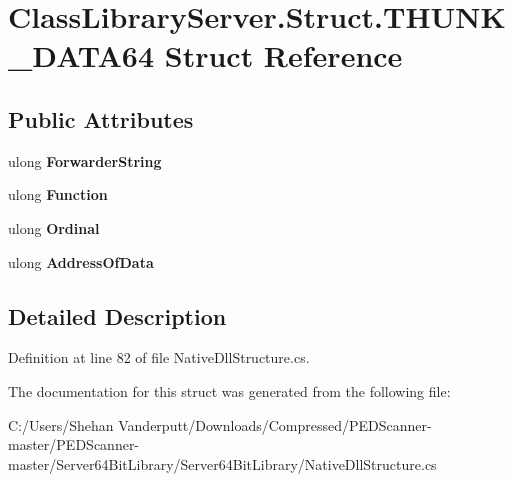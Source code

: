 \hypertarget{struct_class_library_server_1_1_struct_1_1_t_h_u_n_k___d_a_t_a64}{}\section{Class\+Library\+Server.\+Struct.\+T\+H\+U\+N\+K\+\_\+\+D\+A\+T\+A64 Struct Reference}
\label{struct_class_library_server_1_1_struct_1_1_t_h_u_n_k___d_a_t_a64}
\subsection*{Public Attributes}
\begin{DoxyCompactItemize}
\item 
\mbox{\label{struct_class_library_server_1_1_struct_1_1_t_h_u_n_k___d_a_t_a64_a3c1a35933a1fb6204aa82f38f92600e3}} 
ulong {\bfseries Forwarder\+String}
\item 
\mbox{\label{struct_class_library_server_1_1_struct_1_1_t_h_u_n_k___d_a_t_a64_ab2784b529fec7927b230d3baada26493}} 
ulong {\bfseries Function}
\item 
\mbox{\label{struct_class_library_server_1_1_struct_1_1_t_h_u_n_k___d_a_t_a64_a4e632fcf0f42805dcc99222258780847}} 
ulong {\bfseries Ordinal}
\item 
\mbox{\label{struct_class_library_server_1_1_struct_1_1_t_h_u_n_k___d_a_t_a64_a22e5cc24319658541dd23702a97cffcf}} 
ulong {\bfseries Address\+Of\+Data}
\end{DoxyCompactItemize}


\subsection{Detailed Description}


Definition at line 82 of file Native\+Dll\+Structure.\+cs.



The documentation for this struct was generated from the following file\+:\begin{DoxyCompactItemize}
\item 
C\+:/\+Users/\+Shehan Vanderputt/\+Downloads/\+Compressed/\+P\+E\+D\+Scanner-\/master/\+P\+E\+D\+Scanner-\/master/\+Server64\+Bit\+Library/\+Server64\+Bit\+Library/Native\+Dll\+Structure.\+cs\end{DoxyCompactItemize}

